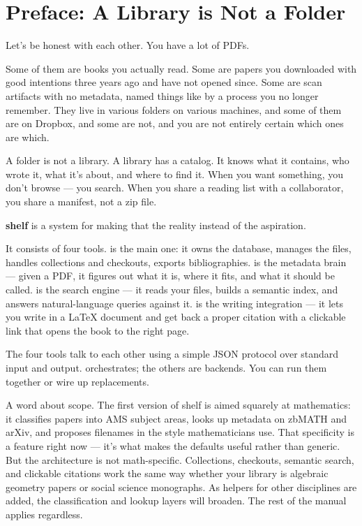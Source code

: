 \chapter{Preface: A Library is Not a Folder}

Let's be honest with each other. You have a lot of PDFs.

Some of them are books you actually read. Some are papers you downloaded
with good intentions three years ago and have not opened since. Some are
scan artifacts with no metadata, named things like
 by a process you no longer remember.
They live in various folders on various machines, and some of them are on
Dropbox, and some are not, and you are not entirely certain which ones are
which.

A folder is not a library. A library has a catalog. It knows what it
contains, who wrote it, what it's about, and where to find it. When you
want something, you don't browse --- you search. When you share a reading
list with a collaborator, you share a manifest, not a zip file.

\textbf{shelf} is a system for making that the reality instead of the aspiration.

It consists of four tools.  is the main one: it owns the
database, manages the files, handles collections and checkouts, exports
bibliographies.  is the metadata brain --- given a
PDF, it figures out what it is, where it fits, and what it should be
called.  is the search engine --- it reads your files,
builds a semantic index, and answers natural-language queries against it.
 is the writing integration --- it lets you write
 in a \LaTeX{} document and get back
a proper citation with a clickable link that opens the book to the right
page.

The four tools talk to each other using a simple JSON protocol over
standard input and output.  orchestrates; the others are
backends. You can run them together or wire up replacements.

A word about scope. The first version of shelf is aimed squarely at
mathematics: it classifies papers into AMS subject areas, looks up metadata
on zbMATH and arXiv, and proposes filenames in the style mathematicians
use. That specificity is a feature right now --- it's what makes the
defaults useful rather than generic. But the architecture is not
math-specific. Collections, checkouts, semantic search, and clickable
citations work the same way whether your library is algebraic geometry
papers or social science monographs. As helpers for other disciplines are
added, the classification and lookup layers will broaden. The rest of the
manual applies regardless.

